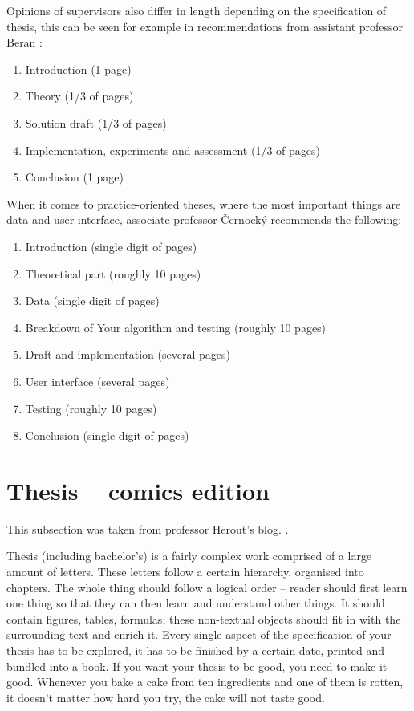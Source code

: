 {{Opinions of supervisors also differ in length depending on the specification of thesis, this can be seen for example in recommendations from assistant professor Beran \cite{Beran}:
\begin{enumerate}
\item Introduction (1 page)
\item Theory (1/3 of pages)
\item Solution draft (1/3 of pages)
\item Implementation, experiments and assessment (1/3 of pages)
\item Conclusion (1 page)
\end{enumerate}

When it comes to practice-oriented theses, where the most important things are data and user interface, associate professor Černocký \cite{Cernocky} recommends the following:
\begin{enumerate}
\item Introduction (single digit of pages)
\item Theoretical part (roughly 10 pages)
\item Data (single digit of pages)
\item Breakdown of Your algorithm and testing (roughly 10 pages)
\item Draft and implementation (several pages)
\item User interface (several pages)
\item Testing (roughly 10 pages)
\item Conclusion (single digit of pages)
\end{enumerate}

\section{Thesis -- comics edition}

This subsection was taken from professor Herout's blog. \cite{Herout}.

Thesis (including bachelor's) is a fairly complex work comprised of a large amount of letters. These letters follow a certain hierarchy, organised into chapters. The whole thing should follow a logical order -- reader should first learn one thing so that they can then learn and understand other things. It should contain figures, tables, formulas; these non-textual objects should fit in with the surrounding text and enrich it. Every single aspect of the specification of your thesis has to be explored, it has to be finished by a certain date, printed and bundled into a book. If you want your thesis to be good, you need to make it good. Whenever you bake a cake from ten ingredients and one of them is rotten, it doesn't matter how hard you try, the cake will not taste good.

}}
